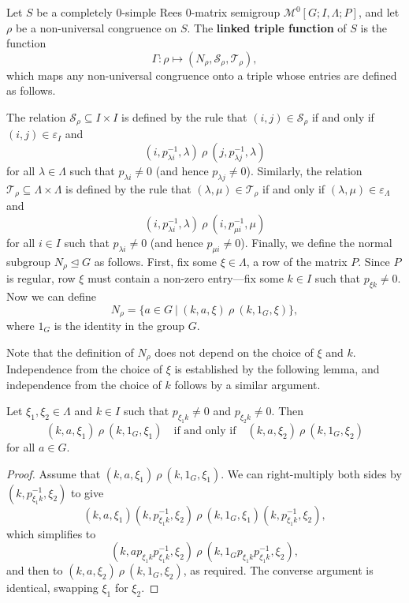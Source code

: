 \begin{definition}
  Let $S$ be a completely 0-simple Rees 0-matrix semigroup
  $\mathcal{M}^0[G;I,\Lambda;P]$, and let $\rho$ be a non-universal congruence
  on $S$.
  The \textbf{linked triple function} of $S$ is the function
  $$\Gamma: \rho \mapsto (N_\rho, \mathcal{S}_\rho, \mathcal{T}_\rho),$$
  which maps any non-universal congruence onto a triple whose entries are
  defined as follows.

  The relation $\mathcal{S}_\rho \subseteq I \times I$ is defined by the rule that
  $(i,j) \in \mathcal{S}_\rho$ if and only if $(i,j) \in \varepsilon_I$ and
  $$(i, p_{\lambda i}^{-1}, \lambda) ~\rho~ (j, p_{\lambda j}^{-1}, \lambda)$$
  for all $\lambda \in \Lambda$ such that $p_{\lambda i} \neq 0$ (and hence
  $p_{\lambda j} \neq 0$).  Similarly, the relation
  $\mathcal{T}_\rho \subseteq \Lambda \times \Lambda$ is defined by the rule that
  $(\lambda,\mu) \in \mathcal{T}_\rho$ if and only if
  $(\lambda,\mu) \in \varepsilon_\Lambda$ and
  $$(i, p_{\lambda i}^{-1}, \lambda) ~\rho~ (i, p_{\mu i}^{-1}, \mu)$$
  for all $i \in I$ such that $p_{\lambda i} \neq 0$ (and hence
  $p_{\mu i} \neq 0$).  Finally, we define the normal subgroup
  $N_\rho \trianglelefteq G$ as follows.  First, fix some $\xi \in \Lambda$, a
  row of the matrix $P$.  Since $P$ is regular, row $\xi$ must contain a
  non-zero entry---fix some $k \in I$ such that $p_{\xi k} \neq 0$.  Now we can
  define
  $$N_\rho = \{a \in G ~|~ (k, a, \xi) ~\rho~ (k, 1_G, \xi)\},$$
  where $1_G$ is the identity in the group $G$.
\end{definition}

Note that the definition of $N_\rho$ does not depend on the choice of $\xi$ and
$k$.  Independence from the choice of $\xi$ is established by the following
lemma, and independence from the choice of $k$ follows by a similar argument.

\begin{lemma}
  Let $\xi_1, \xi_2 \in \Lambda$ and $k \in I$ such that $p_{\xi_1k}^{} \neq 0$
  and $p_{\xi_2 k}^{} \neq 0$.  Then
  $$(k, a, \xi_1) ~\rho~ (k, 1_G, \xi_1)
  \quad \text{if and only if} \quad
  (k, a, \xi_2) ~\rho~ (k, 1_G, \xi_2)$$
  for all $a \in G$.
  \begin{proof}
    Assume that $(k, a, \xi_1) ~\rho~ (k, 1_G, \xi_1)$.  We can right-multiply
    both sides by $(k, p_{\xi_1k}^{-1}, \xi_2)$ to give
    $$(k, a, \xi_1)(k, p_{\xi_1k}^{-1}, \xi_2)
    ~\rho~ (k, 1_G, \xi_1)(k, p_{\xi_1k}^{-1}, \xi_2),$$
    which simplifies to
    $$(k, a p_{\xi_1k}^{} p_{\xi_1k}^{-1}, \xi_2)
    ~\rho~ (k, 1_G p_{\xi_1k}^{} p_{\xi_1k}^{-1}, \xi_2),$$
    and then to
    $(k, a, \xi_2) ~\rho~ (k, 1_G, \xi_2)$,
    as required.
    The converse argument is identical, swapping $\xi_1$ for $\xi_2$.
  \end{proof}
\end{lemma}

